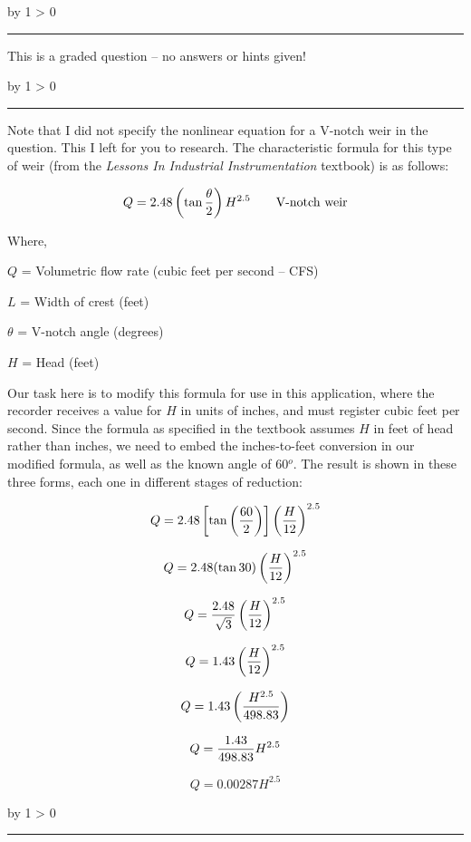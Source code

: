 \documentclass[12pt,a4paper]{article}
\def\oppgave{
            \advance\questnum by 1
            \ifnum \questnum > 0
                 \hrule
                 \vskip 3pt
                 \leftline{Oppgave \the\questnum}
                 \vskip 3pt \fi}
\def\svar{
           \advance\answnum by 1
           \ifnum \answnum > 0
                \hrule
                \vskip 3pt
                \leftline{Svar \the\answnum}
                \vskip 3pt \fi}
\def\notes{
           \advance\explnum by 1
           \ifnum \explnum > 0
                \hrule
                \vskip 3pt
                \leftline{Notes \the\explnum}
                \vskip 3pt \fi}
\begin{document}
\svar{} 

This is a graded question -- no answers or hints given!

\vskip 10pt \filbreak 





\notes{} 

Note that I did not specify the nonlinear equation for a V-notch weir in the question.  This I left for you to research.  The characteristic formula for this type of weir (from the {\it Lessons In Industrial Instrumentation} textbook) is as follows:

$$Q = 2.48 \left( \tan {\theta \over 2} \right) H^{2.5} \hbox{\hskip 20pt V-notch weir}$$

\noindent
Where,

$Q$ = Volumetric flow rate (cubic feet per second -- CFS)

$L$ = Width of crest (feet)

$\theta$ = V-notch angle (degrees)

$H$ = Head (feet)

\vskip 10pt

Our task here is to modify this formula for use in this application, where the recorder receives a value for $H$ in units of inches, and must register cubic feet per second.  Since the formula as specified in the textbook assumes $H$ in feet of head rather than inches, we need to embed the inches-to-feet conversion in our modified formula, as well as the known angle of 60$^{o}$.  The result is shown in these three forms, each one in different stages of reduction:

$$Q = 2.48 \left[\tan \left(60 \over 2\right)\right] \left({H \over 12} \right)^{2.5}$$

$$Q = 2.48 (\tan 30) \left({H \over 12} \right)^{2.5}$$

$$Q = {2.48 \over \sqrt{3}} \left({H \over 12} \right)^{2.5}$$

$$Q = 1.43 \left({H \over 12} \right)^{2.5}$$

$$Q = 1.43 \left({H^{2.5} \over 498.83} \right)$$

$$Q = {1.43 \over 498.83} H^{2.5}$$

$$Q = 0.00287 H^{2.5}$$


\vfil \eject 


\oppgave{} 
\end{document}
